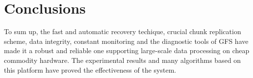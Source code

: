 \documentclass[10pt, letterpaper]{article}
\begin{document}
\section{Conclusions}
To sum up, the fast and automatic recovery techique, crucial chunk replication scheme, data integrity, constant
monitoring and the diagnostic tools of GFS have
made it a robust and reliable one supporting large-scale data processing on cheap commodity hardware. The experimental
results and many algorithms based on this platform have proved the effectiveness of the system. 



\end{document}

